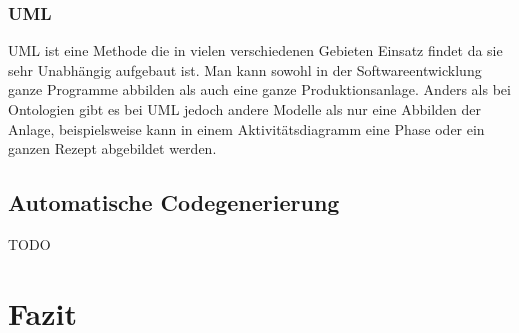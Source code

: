 \subsubsection{UML}
UML ist eine Methode die in vielen verschiedenen Gebieten Einsatz findet da sie sehr Unabhängig aufgebaut ist. Man kann sowohl in der Softwareentwicklung ganze Programme abbilden als auch eine ganze Produktionsanlage. Anders als bei Ontologien gibt es bei UML jedoch andere Modelle als nur eine Abbilden der Anlage, beispielsweise kann in einem Aktivitätsdiagramm eine Phase oder ein ganzen Rezept abgebildet werden.
\subsection{Automatische Codegenerierung}

TODO

\section{Fazit}

